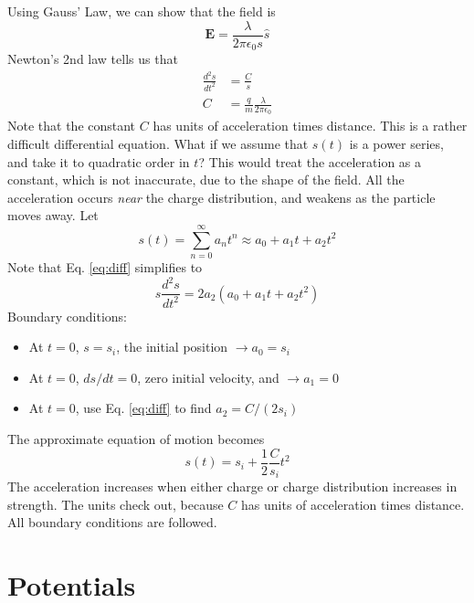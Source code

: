 \documentclass[10pt]{article}
\begin{document}
\begin{enumerate}
Using Gauss' Law, we can show that the field is
\begin{equation}
\mathbf{E} = \frac{\lambda}{2\pi\epsilon_0 s}\hat{s}
\end{equation}
Newton's 2nd law tells us that
\begin{align}
\frac{d^2 s}{dt^2} &= \frac{C}{s} \label{eq:diff} \\
C &= \frac{q}{m}\frac{\lambda}{2\pi\epsilon_0}
\end{align}
Note that the constant $C$ has units of acceleration times distance.  This is a rather difficult differential equation.  What if we assume that $s(t)$ is a power series, and take it to quadratic order in $t$?  This would treat the acceleration as a constant, which is not inaccurate, due to the shape of the field.  All the acceleration occurs \textit{near} the charge distribution, and weakens as the particle moves away.  Let
\begin{equation}
s(t) = \sum_{n = 0}^{\infty} a_n t^n \approx a_0 + a_1 t + a_2 t^2
\end{equation}
Note that Eq. \ref{eq:diff} simplifies to
\begin{equation}
s \frac{d^2 s}{dt^2} = 2 a_2 (a_0 + a_1 t + a_2 t^2) 
\end{equation}
Boundary conditions:
\begin{itemize}
\item At $t=0$, $s = s_i$, the initial position $\rightarrow a_0 = s_i$
\item At $t = 0$, $ds/dt = 0$, zero initial velocity, and $\rightarrow a_1 = 0$
\item At $t = 0$, use Eq. \ref{eq:diff} to find $a_2 = C/(2 s_i)$
\end{itemize}
The approximate equation of motion becomes
\begin{equation}
s(t) = s_i + \frac{1}{2}\frac{C}{s_i}t^2
\end{equation}
The acceleration increases when either charge or charge distribution increases in strength.  The units check out, because $C$ has units of acceleration times distance.  All boundary conditions are followed.
\end{enumerate}

\section{Potentials}
\end{document}
